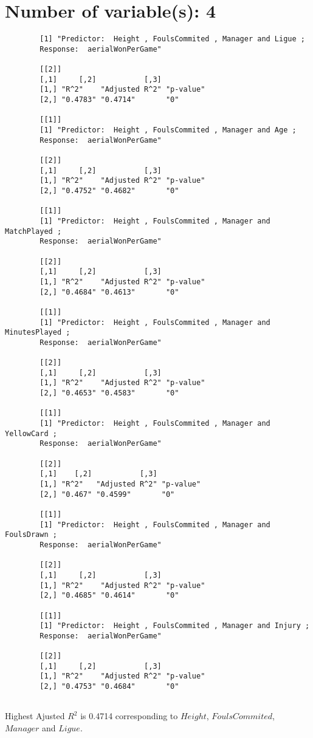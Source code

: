 \documentclass[12pt]{article}
\begin{document}
	\section{Number of variable(s): 4}
	\begin{verbatim}
		[1] "Predictor:  Height , FoulsCommited , Manager and Ligue ; 
		Response:  aerialWonPerGame"
		
		[[2]]
		[,1]     [,2]           [,3]     
		[1,] "R^2"    "Adjusted R^2" "p-value"
		[2,] "0.4783" "0.4714"       "0"      
		
		[[1]]
		[1] "Predictor:  Height , FoulsCommited , Manager and Age ; 
		Response:  aerialWonPerGame"
		
		[[2]]
		[,1]     [,2]           [,3]     
		[1,] "R^2"    "Adjusted R^2" "p-value"
		[2,] "0.4752" "0.4682"       "0"      
		
		[[1]]
		[1] "Predictor:  Height , FoulsCommited , Manager and MatchPlayed ; 
		Response:  aerialWonPerGame"
		
		[[2]]
		[,1]     [,2]           [,3]     
		[1,] "R^2"    "Adjusted R^2" "p-value"
		[2,] "0.4684" "0.4613"       "0"      
		
		[[1]]
		[1] "Predictor:  Height , FoulsCommited , Manager and MinutesPlayed ; 
		Response:  aerialWonPerGame"
		
		[[2]]
		[,1]     [,2]           [,3]     
		[1,] "R^2"    "Adjusted R^2" "p-value"
		[2,] "0.4653" "0.4583"       "0"      
		
		[[1]]
		[1] "Predictor:  Height , FoulsCommited , Manager and YellowCard ; 
		Response:  aerialWonPerGame"
		
		[[2]]
		[,1]    [,2]           [,3]     
		[1,] "R^2"   "Adjusted R^2" "p-value"
		[2,] "0.467" "0.4599"       "0"      
		
		[[1]]
		[1] "Predictor:  Height , FoulsCommited , Manager and FoulsDrawn ; 
		Response:  aerialWonPerGame"
		
		[[2]]
		[,1]     [,2]           [,3]     
		[1,] "R^2"    "Adjusted R^2" "p-value"
		[2,] "0.4685" "0.4614"       "0"      
		
		[[1]]
		[1] "Predictor:  Height , FoulsCommited , Manager and Injury ; 
		Response:  aerialWonPerGame"
		
		[[2]]
		[,1]     [,2]           [,3]     
		[1,] "R^2"    "Adjusted R^2" "p-value"
		[2,] "0.4753" "0.4684"       "0"      
		
	\end{verbatim}
	Highest Ajusted $ R^2 $ is 0.4714 corresponding to $ Height $, $ FoulsCommited $, $ Manager $ and $ Ligue $.
	
\end{document}
